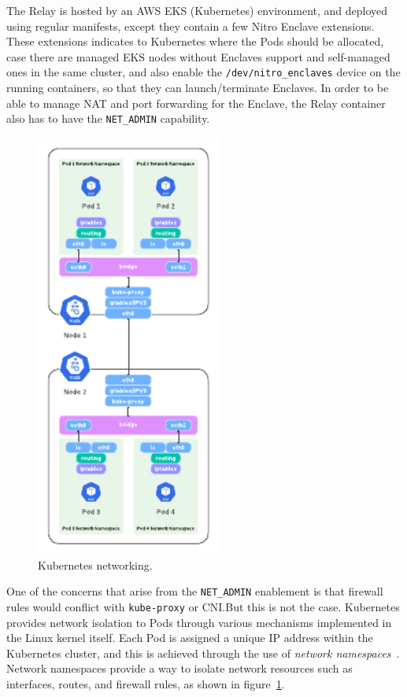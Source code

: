 \documentclass[a4paper, twocolumn]{article}
\begin{document}
The Relay is hosted by an AWS EKS (Kubernetes) environment, and deployed using
regular manifests, except they contain a few Nitro Enclave extensions. These
extensions indicates to Kubernetes where the Pods should be allocated, case
there are managed EKS nodes without Enclaves support and self-managed ones in
the same cluster, and also enable the \texttt{/dev/nitro\_enclaves} device on
the running containers, so that they can launch/terminate Enclaves. In order to
be able to manage NAT and port forwarding for the Enclave, the Relay container
also has to have the \texttt{NET\_ADMIN} capability. 

\begin{figure}
  \centering
  \includegraphics[height=14cm,keepaspectratio]{kubernetes-arch.pdf}
  \caption{Kubernetes networking.}\label{fig:k8s-arch1}
\end{figure}

One of the concerns that arise from the \texttt{NET\_ADMIN} enablement is that
firewall rules would conflict with \texttt{kube-proxy} or CNI.\@ But this is
not the case. Kubernetes provides network isolation to Pods through various
mechanisms implemented in the Linux kernel itself. Each Pod is assigned a
unique IP address within the Kubernetes cluster, and this is achieved through
the use of \textit{network namespaces}~\cite{critelli_2022}. Network namespaces
provide a way to isolate network resources such as interfaces, routes, and
firewall rules, as shown in figure~\ref{fig:k8s-arch1}.
\end{document}

